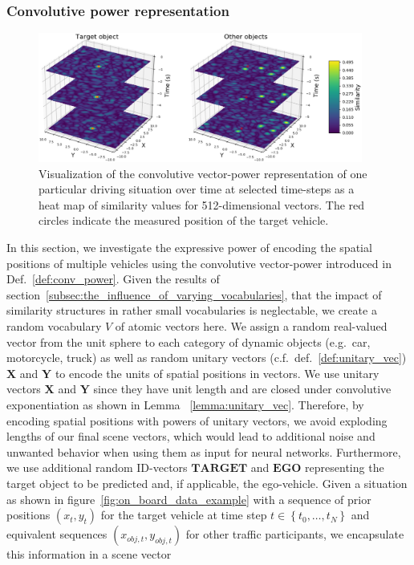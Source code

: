 \subsubsection{Convolutive power representation}%
\label{ssubsec:convolutive_power_representation}

\begin{figure}[t!]
  \centering
  \includegraphics[width=0.95\textwidth]{imgs/spa_power_representation_in_time_viridis.eps}
  \caption{Visualization of the convolutive vector-power representation of one particular driving situation over time at selected time-steps as a heat map of similarity values for \num{512}-dimensional vectors. The red circles indicate the measured position of the target vehicle.}\label{fig:spa_power}
\end{figure}

In this section, we investigate the expressive power of encoding the spatial positions of multiple vehicles using the convolutive vector-power introduced in Def.~\ref{def:conv_power}.
Given the results of section~\ref{subsec:the_influence_of_varying_vocabularies}, that the impact of similarity structures in rather small vocabularies is neglectable, we create a random vocabulary $V$ of atomic vectors here.
We assign a random real-valued vector from the unit sphere to each category of dynamic objects (e.g.\ car, motorcycle, truck) as well as random unitary vectors (c.f.\ def.~\ref{def:unitary_vec}) $\mathbf{X}$ and $\mathbf{Y}$ to encode the units of spatial positions in vectors.
We use unitary vectors $\mathbf{X}$ and $\mathbf{Y}$ since they have unit length and are closed under convolutive exponentiation as shown in Lemma ~\ref{lemma:unitary_vec}.
Therefore, by encoding spatial positions with powers of unitary vectors, we avoid exploding lengths of our final scene vectors, which would lead to additional noise and unwanted behavior when using them as input for neural networks.
Furthermore, we use additional random ID-vectors $\mathbf{TARGET}$ and $\mathbf{EGO}$ representing the target object to be predicted and, if applicable, the ego-vehicle.
Given a situation as shown in figure~\ref{fig:on_board_data_example} with a sequence of prior positions $(x_{t}, y_{t})$ for the target vehicle at time step $t \in \left\{t_{0}, \ldots, t_{N} \right\}$ and equivalent sequences $(x_{obj,t}, y_{obj,t})$ for other traffic participants, we encapsulate this information in a scene vector

